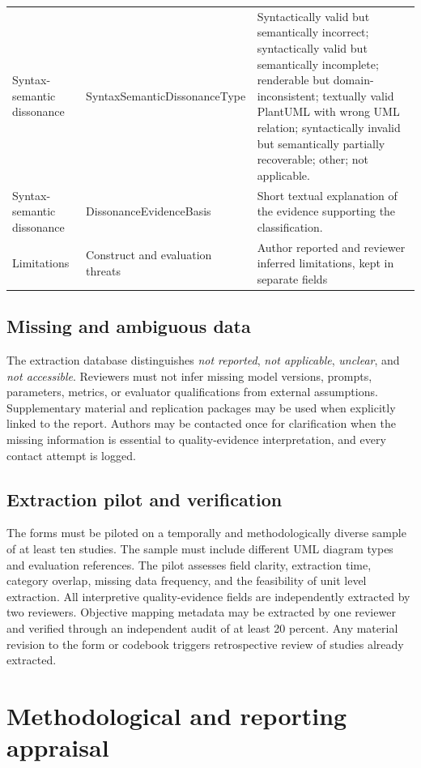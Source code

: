 \begin{longtable}{p{} p{} p{}}
Syntax-semantic dissonance & SyntaxSemanticDissonanceType & Syntactically valid but semantically incorrect; syntactically valid but semantically incomplete; renderable but domain-inconsistent; textually valid PlantUML with wrong UML relation; syntactically invalid but semantically partially recoverable; other; not applicable. \\
Syntax-semantic dissonance & DissonanceEvidenceBasis & Short textual explanation of the evidence supporting the classification. \\
Limitations & Construct and evaluation threats & Author reported and reviewer inferred limitations, kept in separate fields \\
\bottomrule
\end{longtable}

\subsection{Missing and ambiguous data}

The extraction database distinguishes \textit{not reported}, \textit{not applicable}, \textit{unclear}, and \textit{not accessible}. Reviewers must not infer missing model versions, prompts, parameters, metrics, or evaluator qualifications from external assumptions. Supplementary material and replication packages may be used when explicitly linked to the report. Authors may be contacted once for clarification when the missing information is essential to quality-evidence interpretation, and every contact attempt is logged.

\subsection{Extraction pilot and verification}

The forms must be piloted on a temporally and methodologically diverse sample of at least ten studies. The sample must include different UML diagram types and evaluation references. The pilot assesses field clarity, extraction time, category overlap, missing data frequency, and the feasibility of unit level extraction. All interpretive quality-evidence fields are independently extracted by two reviewers. Objective mapping metadata may be extracted by one reviewer and verified through an independent audit of at least 20 percent. Any material revision to the form or codebook triggers retrospective review of studies already extracted.

\section{Methodological and reporting appraisal}
\label{sec:protocol_appraisal}

